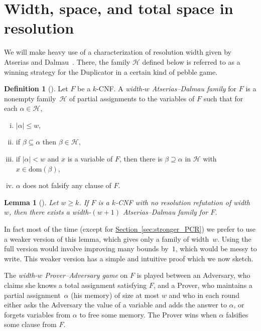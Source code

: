 \documentclass[11pt]{article}
\numberwithin{equation}{section}
\newtheorem{lemma}[theorem]{Lemma}
\theoremstyle{definition}
\newtheorem{definition}[theorem]{Definition}
\theoremstyle{plain}
\newcommand{\expref}[2]{\hyperref[#2]{#1~\ref{#2}}}
\newcommand\calH{\mathcal{H}}
\newcommand\dom{\mathrm{dom}}
\begin{document}
%
\section{Width, space, and total space in resolution}
%
\label{sec:totalspace}

We will make heavy use of a characterization of resolution width
given by Atserias and Dalmau~\cite{DBLP:journals/jcss/AtseriasD08}.  
There, the family $\calH$ defined below
is referred to as a winning strategy for the Duplicator in a certain kind of pebble game.

\begin{definition}[\cite{DBLP:journals/jcss/AtseriasD08}] \label{def:AD_family}
Let $F$ be a $k$-CNF. A \emph{width-$w$ Atserias--Dalmau family} for $F$ 
is a nonempty family~$\calH$ of partial assignments to the variables of $F$ such that
for each $\alpha \in \calH$,
\begin{enumerate}[(i)]
\item 
$|\alpha| \le w$,
\item 
if  $\beta \subseteq \alpha$ then $\beta \in \calH$,
\item 
if $|\alpha|< w$ and $x$ is a variable of $F$, then there is 
$\beta \supseteq \alpha$ in $\calH$ with $x \in \dom(\beta)$,
\item\label{def-item:ad-soundness} 
$\alpha$ does not falsify any clause of $F$.
\end{enumerate}
\end{definition}

\begin{lemma}[\cite{DBLP:journals/jcss/AtseriasD08}]
\label{lem:atserias--dalmau}
Let $w \ge k$. If $F$ is a $k$-CNF with no resolution refutation of width $w$, then there exists
a width-$(w+1)$ Atserias--Dalmau family for $F$.
\end{lemma}

In fact most of the time (except for 
\expref{Section}{sec:stronger_PCR}) we prefer to use
a weaker version of this lemma, which gives only
a family of width~$w$. Using the full version 
would involve improving many bounds by~$1$, which would
be messy to  write. 
This weaker version has a simple and intuitive proof which
we now sketch.

The \emph{width-$w$ Prover--Adversary game} on $F$
is played between an Adversary,
who claims she knows a  total assignment satisfying $F$, and 
a Prover, who maintains a partial assignment~$\alpha$ (his memory)
of size at most $w$
and who in each round either asks the Adversary the value of a variable
and adds the answer to $\alpha$, or forgets variables from $\alpha$
to free some memory. 
The Prover wins when $\alpha$ falsifies some clause from $F$.
\end{document}
